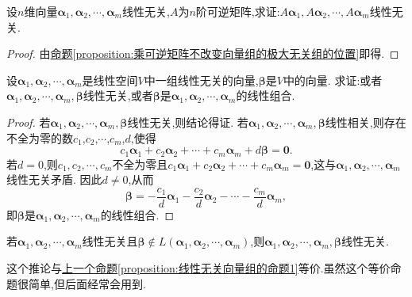 \documentclass[../../main.tex]{subfiles}%
\begin{document}
\begin{corollary}\label{corollary:线性无关向量组乘可逆矩阵仍然线性无关}
设\(n\)维向量\(\boldsymbol{\alpha}_1,\boldsymbol{\alpha}_2,\cdots,\boldsymbol{\alpha}_m\)线性无关,\(A\)为\(n\)阶可逆矩阵,求证:\(A\boldsymbol{\alpha}_1,A\boldsymbol{\alpha}_2,\cdots,A\boldsymbol{\alpha}_m\)线性无关.
\end{corollary}
\begin{proof}

由\hyperref[proposition:乘可逆矩阵不改变向量组的极大无关组的位置]{命题\ref{proposition:乘可逆矩阵不改变向量组的极大无关组的位置}}即得.

\end{proof}

\begin{proposition}\label{proposition:线性无关向量组的命题1}
设\(\boldsymbol{\alpha}_1,\boldsymbol{\alpha}_2,\cdots,\boldsymbol{\alpha}_m\)是线性空间\(V\)中一组线性无关的向量,\(\boldsymbol{\beta}\)是\(V\)中的向量. 求证:或者\(\boldsymbol{\alpha}_1,\boldsymbol{\alpha}_2,\cdots,\boldsymbol{\alpha}_m,\boldsymbol{\beta}\)线性无关,或者\(\boldsymbol{\beta}\)是\(\boldsymbol{\alpha}_1,\boldsymbol{\alpha}_2,\cdots,\boldsymbol{\alpha}_m\)的线性组合.
\end{proposition}
\begin{proof}

若\(\boldsymbol{\alpha}_1,\boldsymbol{\alpha}_2,\cdots,\boldsymbol{\alpha}_m,\boldsymbol{\beta}\)线性无关,则结论得证. 若\(\boldsymbol{\alpha}_1,\boldsymbol{\alpha}_2,\cdots,\boldsymbol{\alpha}_m,\boldsymbol{\beta}\)线性相关,则存在不全为零的数$c_1$,$c_2$,$\cdots$,$c_m$,$d$,使得
\[
c_1\boldsymbol{\alpha}_1 + c_2\boldsymbol{\alpha}_2+\cdots + c_m\boldsymbol{\alpha}_m + d\boldsymbol{\beta}=\boldsymbol{0}.
\]
若\(d = 0\),则\(c_1,c_2,\cdots,c_m\)不全为零且\(c_1\boldsymbol{\alpha}_1 + c_2\boldsymbol{\alpha}_2+\cdots + c_m\boldsymbol{\alpha}_m=\boldsymbol{0}\),这与\(\boldsymbol{\alpha}_1,\boldsymbol{\alpha}_2,\cdots,\boldsymbol{\alpha}_m\)线性无关矛盾. 因此\(d\neq0\),从而
\[
\boldsymbol{\beta}=-\frac{c_1}{d}\boldsymbol{\alpha}_1-\frac{c_2}{d}\boldsymbol{\alpha}_2-\cdots-\frac{c_m}{d}\boldsymbol{\alpha}_m,
\]
即\(\boldsymbol{\beta}\)是\(\boldsymbol{\alpha}_1,\boldsymbol{\alpha}_2,\cdots,\boldsymbol{\alpha}_m\)的线性组合.

\end{proof}

\begin{corollary}\label{corollary:线性无关向量组的命题1}
若\(\boldsymbol{\alpha}_1,\boldsymbol{\alpha}_2,\cdots,\boldsymbol{\alpha}_m\)线性无关且\(\boldsymbol{\beta}\notin L(\boldsymbol{\alpha}_1,\boldsymbol{\alpha}_2,\cdots,\boldsymbol{\alpha}_m)\),则\(\boldsymbol{\alpha}_1,\boldsymbol{\alpha}_2,\cdots,\boldsymbol{\alpha}_m,\boldsymbol{\beta}\)线性无关. 
\end{corollary}
\begin{note}
这个推论与\hyperref[proposition:线性无关向量组的命题1]{上一个命题\ref{proposition:线性无关向量组的命题1}}等价.虽然这个等价命题很简单,但后面经常会用到.
\end{note}
\end{document}
